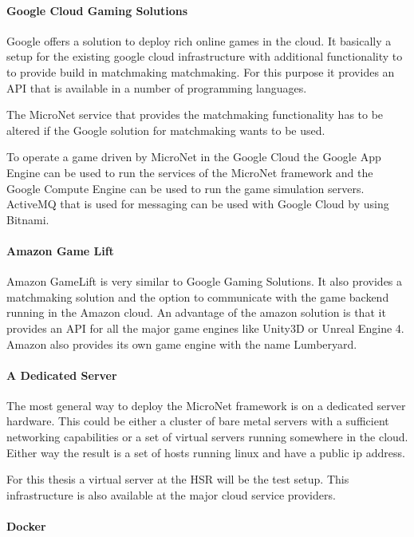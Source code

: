 \paragraph{Google Cloud Gaming Solutions}

Google offers a solution to deploy rich online games in the cloud. It basically
a setup for the existing google cloud infrastructure with additional
functionality to to provide build in matchmaking matchmaking. For this purpose
it provides an API that is available in a number of programming languages.

The MicroNet service that provides the matchmaking functionality has to be
altered if the Google solution for matchmaking wants to be used. 

To operate a game driven by MicroNet in the Google Cloud the Google App Engine
can be used to run the services of the MicroNet framework and the Google Compute
Engine can be used to run the game simulation servers. ActiveMQ that is used for
messaging can be used with Google Cloud by using Bitnami.

\paragraph{Amazon Game Lift}

Amazon GameLift is very similar to Google Gaming Solutions. It also provides a
matchmaking solution and the option to communicate with the game backend running
in the Amazon cloud. An advantage of the amazon solution is that it provides an
API for all the major game engines like Unity3D or Unreal Engine 4. Amazon also
provides its own game engine with the name Lumberyard.

\paragraph{A Dedicated Server}

The most general way to deploy the MicroNet framework is on a dedicated server
hardware. This could be either a cluster of bare metal servers with a sufficient
networking capabilities or a set of virtual servers running somewhere in the
cloud. Either way the result is a set of hosts running linux and have a public
ip address.

For this thesis a virtual server at the HSR will be the test setup. This
infrastructure is also available at the major cloud service providers.

\paragraph{Docker}

